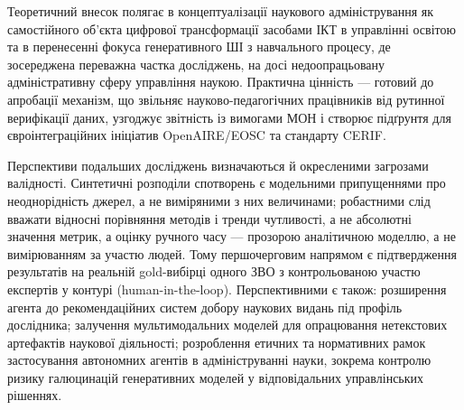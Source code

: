 Теоретичний внесок полягає в концептуалізації наукового адміністрування як самостійного об'єкта цифрової трансформації засобами ІКТ в управлінні освітою та в перенесенні фокуса генеративного ШІ з навчального процесу, де зосереджена переважна частка досліджень, на досі недоопрацьовану адміністративну сферу управління наукою. Практична цінність --- готовий до апробації механізм, що звільняє науково-педагогічних працівників від рутинної верифікації даних, узгоджує звітність із вимогами МОН і створює підґрунтя для євроінтеграційних ініціатив OpenAIRE/EOSC та стандарту CERIF.

Перспективи подальших досліджень визначаються й окресленими загрозами валідності. Синтетичні розподіли спотворень є модельними припущеннями про неоднорідність джерел, а не виміряними з них величинами; робастними слід вважати відносні порівняння методів і тренди чутливості, а не абсолютні значення метрик, а оцінку ручного часу --- прозорою аналітичною моделлю, а не вимірюванням за участю людей. Тому першочерговим напрямом є підтвердження результатів на реальній gold-вибірці одного ЗВО з контрольованою участю експертів у контурі (human-in-the-loop). Перспективними є також: розширення агента до рекомендаційних систем добору наукових видань під профіль дослідника; залучення мультимодальних моделей для опрацювання нетекстових артефактів наукової діяльності; розроблення етичних та нормативних рамок застосування автономних агентів в адмініструванні науки, зокрема контролю ризику галюцинацій генеративних моделей у відповідальних управлінських рішеннях.